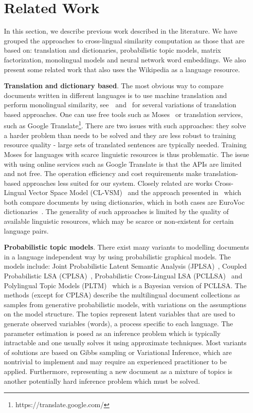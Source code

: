 \section{Related Work}\label{chap:crosslingual:related}
In this section, we describe previous work described  in the literature. We have grouped the approaches to cross-lingual similarity computation as those that are based on: translation and dictionaries, probabilistic topic models, matrix factorization, monolingual models and neural network word embeddings. We also present some related work that also uses the Wikipedia as a language resource.

\textbf{Translation and dictionary based}. The most obvious way to compare documents written in different languages is to use machine translation and perform monolingual similarity, see~\cite{multilingualBook}~and~\cite{plagiarism} for several variations of translation based approaches. One can use free tools such as Moses~\cite{moses} or translation services, such as Google Translate\footnote{https://translate.google.com/}. There are two issues with such approaches: they solve a harder problem than needs to be solved and they are less robust to training resource quality - large sets of translated sentences are typically needed. Training Moses for languages with scarce linguistic resources is thus problematic. The issue with using online services such as Google Translate is that the APIs are limited and not free. The operation efficiency and cost requirements make translation-based approaches less suited for our system. Closely related are works Cross-Lingual Vector Space Model (CL-VSM)~\cite{plagiarism} and the approach presented in~\cite{pouliquen2008story} which both compare documents by using dictionaries, which in both cases are EuroVoc dictionaries~\cite{eurovoc}. The generality of such approaches is limited by the quality of available linguistic resources, which may be scarce or non-existent for certain language pairs.

\textbf{Probabilistic topic models}. There exist many variants to modelling documents in a language independent way by using probabilistic graphical models. The models include:  Joint Probabilistic Latent Semantic Analysis (JPLSA)~\cite{platt2010translingual}, Coupled Probabilistic LSA (CPLSA)~\cite{platt2010translingual}, Probabilistic Cross-Lingual LSA (PCLLSA)~\cite{PCL_LSA} and Polylingual Topic Models (PLTM)~\cite{polyLDA} which is a Bayesian version of PCLLSA. The methods (except for CPLSA) describe the multilingual document collections as samples from generative probabilistic models, with variations on the assumptions on the model structure. The topics represent latent variables that are used to generate observed variables (words), a process specific to each language. The parameter estimation is posed as an inference problem which is typically intractable and one usually solves it using approximate techniques. Most variants of solutions are based on Gibbs sampling or Variational Inference, which are nontrivial to implement and may require an experienced practitioner to be applied. Furthermore, representing a new document as a mixture of topics is another potentially hard inference problem which must be solved.

